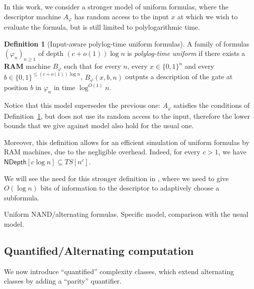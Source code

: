 \documentclass[a4paper, 11pt]{article}
\theoremstyle{plain}
\theoremstyle{definition}
\newtheorem{definition}[theorem]{Definition}
\theoremstyle{remark}
\newcommand{\bit}{\{0,1\}}%
\newcommand{\NAND}{\textsf{NAND}}%
\newcommand{\ND}{\textsf{NDepth}}%
\begin{document}
In this work, we consider a stronger model of uniform formulas, 
where the descriptor machine $A_\varphi$ has random access to the input $x$ 
at which we wish to evaluate the formula, but is still limited to polylogarithmic time.
\begin{definition}[Input-aware polylog-time uniform formulas]\label{def:unif}
	A family of formulas $(\varphi_n)_{n \ge 1}$ of depth $(c + o(1))\log n$ is \textit{polylog-time uniform}
	if there exists a \textbf{RAM} machine $B_\varphi$
	such that for every $n$, every $x\in\bit^n$ and every $b\in\bit^{\leq (c + o(1))\log n}$,
	$B_\varphi(x, b, n)$ outputs a description of the gate at position $b$ in $\varphi_n$ in time $\log^{O(1)} n$.
\end{definition}
Notice that this model supersedes the previous one: 
$A_\varphi$ satisfies the conditions of Definition~\ref{def:unif}, 
but does not use its random access to the input, 
therefore the lower bounds that we give against model also hold for the usual one.

Moreover, this definition allows for an efficient simulation of uniform formulas by RAM machines, 
due to the negligible overhead.
Indeed, for every $c > 1$, we have $\ND[c \log n] \subseteq TS[n^c]$.

We will see the need for this stronger definition in , 
where we need to give $O(\log n)$ bits of information to the descriptor
to adaptively choose a subformula.

Uniform \NAND{}/alternating formulas. Specific model, comparison with the usual model.

\subsection{Quantified/Alternating computation}

We now introduce ``quantified'' complexity classes, which extend alternating classes 
by adding a ``parity'' quantifier.
\end{document}
